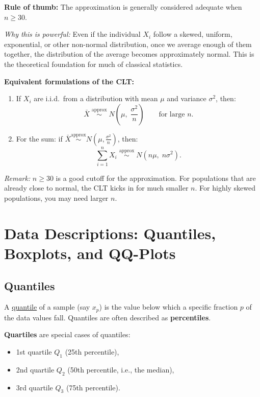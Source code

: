 \documentclass[10pt]{report}
\begin{document}
\textbf{Rule of thumb:} The approximation is generally considered adequate when $n \geq 30$.

\medskip

\textit{Why this is powerful:} Even if the individual $X_i$ follow a skewed, uniform, exponential, or other non-normal distribution, once we average enough of them together, the distribution of the average becomes approximately normal. This is the theoretical foundation for much of classical statistics.

\medskip

\textbf{Equivalent formulations of the CLT:}

\begin{enumerate}
  \item If $X_i$ are i.i.d.\ from a distribution with mean $\mu$ and variance $\sigma^2$, then:
  \[
  \bar{X} \;\overset{\text{approx}}{\sim}\; N\!\left(\mu,\;\frac{\sigma^2}{n}\right) \qquad \text{for large } n.
  \]
  
  \item For the sum: if $\bar{X} \overset{\text{approx}}{\sim} N\!\left(\mu, \frac{\sigma^2}{n}\right)$, then:
  \[
  \sum_{i=1}^n X_i \;\overset{\text{approx}}{\sim}\; N(n\mu,\; n\sigma^2).
  \]
\end{enumerate}

\textit{Remark:} $n \geq 30$ is a good cutoff for the approximation. For populations that are already close to normal, the CLT kicks in for much smaller $n$. For highly skewed populations, you may need larger $n$.

\section{Data Descriptions: Quantiles, Boxplots, and QQ-Plots}

\subsection{Quantiles}

A \underline{quantile} of a sample (say $x_p$) is the value below which a specific fraction $p$ of the data values fall. Quantiles are often described as \textbf{percentiles}.

\textbf{Quartiles} are special cases of quantiles:
\begin{itemize}
  \item 1st quartile $Q_1$ (25th percentile),
  \item 2nd quartile $Q_2$ (50th percentile, i.e., the median),
  \item 3rd quartile $Q_3$ (75th percentile).
\end{itemize}
\end{document}
